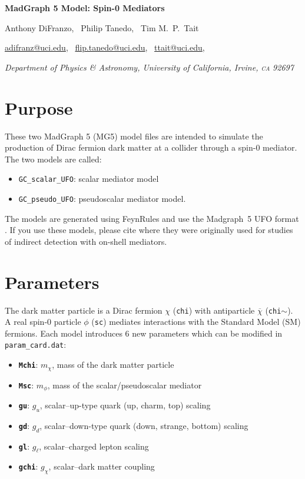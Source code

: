 \documentclass[showpacs,preprintnumbers,amsmath,amssymb]{revtex4}
\def\bar{\overline}
\begin{document}
\setcounter{page}{1}
\pagestyle{plain}

\Large

\begin{center}
{\bf MadGraph 5 Model: Spin-0 Mediators}
\end{center}

\begin{center}
Anthony DiFranzo, \,
Philip Tanedo, \,
Tim M.\ P.\ Tait

\href{mailto:adifranz@uci.edu}{adifranz@uci.edu}, \,
\href{mailto:flip.tanedo@uci.edu}{flip.tanedo@uci.edu}, \,
\href{mailto:ttait@uci.edu}{ttait@uci.edu}, \,

{\it Department of Physics \& Astronomy, University of California, Irvine, \textsc{ca} 92697}
\end{center}


\section{Purpose}

These two MadGraph 5 (MG5) \cite{Alwall:2011uj} model files are intended to simulate the production of Dirac fermion dark matter at a collider through a spin-0 mediator. The two models are called:
\begin{itemize}
\item {\tt GC\_scalar\_UFO}: scalar mediator model
\item {\tt GC\_pseudo\_UFO}: pseudoscalar mediator model.
\end{itemize}
The models are generated using FeynRules \cite{Alloul:2013bka} and use the Madgraph~5 UFO format \cite{Degrande:2011ua}. If you use these models, please cite \cite{Abdullah:2014lla} where they were originally used for studies of indirect detection with on-shell mediators.

\section{Parameters}

The dark matter particle is a Dirac fermion $\chi$ ({\tt chi}) with antiparticle $\bar{\chi}$ ({\tt chi$\sim$}). A real spin-0 particle $\phi$ ({\tt sc}) mediates interactions with the Standard Model (SM) fermions. Each model introduces 6 new parameters which can be modified in {\tt param\_card.dat}:

\begin{itemize}
\item {\bf \tt Mchi}: $m_\chi$, mass of the dark matter particle
\item {\bf \tt Msc}: $m_\phi$, mass of the scalar/pseudoscalar mediator
\item {\bf \tt gu}: $g_u$, scalar--up-type quark (up, charm, top) scaling
\item {\bf \tt gd}: $g_d$, scalar--down-type quark (down, strange, bottom) scaling
\item {\bf \tt gl}: $g_\ell$, scalar--charged lepton scaling
\item {\bf \tt gchi}: $g_\chi$, scalar--dark matter coupling
\end{itemize}
\end{document}
